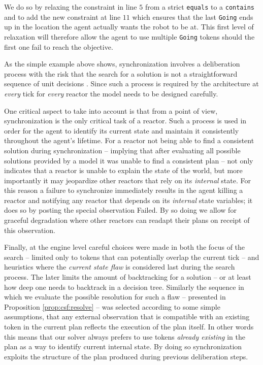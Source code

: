 We do so by relaxing the constraint in line $5$ from a strict
\texttt{equals} to a \texttt{contains} and to add the new constraint
at line $11$ which ensures that the last \texttt{Going} ends up in the
location the agent actually wants the robot to be at. This first level
of relaxation will therefore allow the agent to use multiple
\texttt{Going} tokens should the first one fail to reach the
objective.  

As the simple example above shows, synchronization involves a
deliberation process with the risk that the search for a solution is
not a straightforward sequence of unit decisions . Since such a process is
required by the architecture at \emph{every} tick for \emph{every}
reactor the model needs to be designed carefully.

One critical aspect to take into account is that from a \rx point of
view, synchronization is the only critical task of a reactor. Such a
process is used in order for the agent to identify its current state
and maintain it consistently throughout the agent's lifetime. For a
reactor not being able to find a consistent solution during
synchronization -- implying that after evaluating all possible
solutions provided by a model it was unable to find a consistent plan
-- not only indicates that a reactor is unable to explain the state of
the world, but more importantly it may jeopardize other reactors that
rely on its {\em internal} state. For this reason a failure to
synchronize immediately results in the \rx agent killing a reactor and
notifying any reactor that depends on its {\em internal} state
variables; it does so by posting the special observation
\textsf{Failed}. By so doing we allow for graceful degradation where
other reactors can readapt their plans on receipt of this observation.

Finally, at the engine level careful choices were made in both the
focus of the search -- limited only to tokens that can potentially
overlap the current tick -- and heuristics where the {\em current
  state flaw} is considered last during the search process. The later
limits the amount of backtracking for a solution -- or at least how
deep one needs to backtrack in a decision tree.  Similarly the
sequence in which we evaluate the possible resolution for such a flaw
-- presented in Proposition \ref{prop:csf:resolve} -- was selected
according to some simple assumptions, that any external observation
that is compatible with an existing token in the current plan reflects
the execution of the plan itself. In other words this means that our
solver always prefers to use tokens \emph{already existing} in the
plan as a way to identify current internal state. By doing so
synchronization exploits the structure of the plan produced during
previous deliberation steps.

